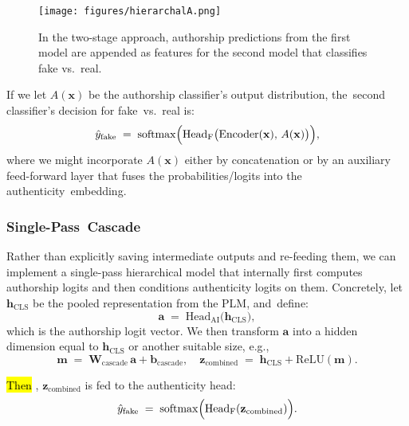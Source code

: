 \documentclass[electronics,article,accept,pdftex,moreauthors,electronics]{Definitions/mdpi}
\begin{document}
\begin{figure}[H] %
    \texttt{[image: figures/hierarchalA.png]}
    \caption{In the two-stage approach, authorship predictions from the first model are appended as features for the second model that classifies fake vs.~real.}
    \label{fig8}
\end{figure}


If we let $A(\mathbf{x})$ be the authorship classifier’s output distribution, the~second classifier’s 
decision for fake~vs.~real is:
\begin{equation}
\label{eq:two_stage_decision}
\hat{y}_{\text{fake}} \;=\; \mathrm{softmax}\Bigl(\mathrm{Head}_{\mathrm{F}}\bigl(\mathrm{Encoder}(\mathbf{x}),\,A(\mathbf{x})\bigr)\Bigr),
\end{equation}
where we might incorporate $A(\mathbf{x})$ either by concatenation or by an auxiliary feed-forward 
layer that fuses the probabilities/logits into the authenticity~embedding.


\subsubsection{Single-Pass~Cascade}

Rather than explicitly saving intermediate outputs and re-feeding them, we can implement a single-pass hierarchical model that internally first computes authorship logits 
and then conditions authenticity logits on them. Concretely, let $\mathbf{h}_{\mathrm{CLS}}$ be 
the pooled representation from the PLM, and~define:
\begin{equation}
\mathbf{a} \;=\; \mathrm{Head}_{\text{AI}}\!\bigl(\mathbf{h}_{\mathrm{CLS}}\bigr),
\end{equation}
which is the authorship logit vector. We then transform $\mathbf{a}$ into a hidden dimension 
equal to $\mathbf{h}_{\mathrm{CLS}}$ or another suitable size, e.g.,
\begin{equation}
\mathbf{m} \;=\; \mathbf{W}_\mathrm{cascade}\,\mathbf{a} + \mathbf{b}_\mathrm{cascade},
\quad
\mathbf{z}_\mathrm{combined} \;=\; \mathbf{h}_{\mathrm{CLS}} + \mathrm{ReLU}(\mathbf{m}).
\end{equation}

\hl{Then}%
, $\mathbf{z}_\mathrm{combined}$ is fed to the authenticity head:
\begin{equation}
\hat{y}_{\text{fake}} \;=\; \mathrm{softmax}\Bigl(\mathrm{Head}_{\mathrm{F}}(\mathbf{z}_\mathrm{combined})\Bigr).
\end{equation}
\end{document}
